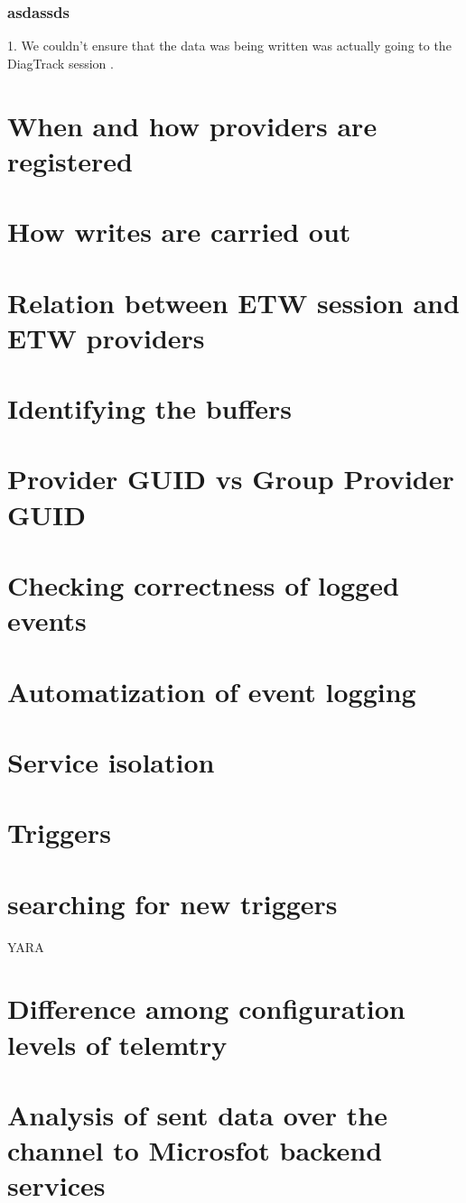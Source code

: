 \subsubsection{\bfseries asdassds}











\newpage
{\huge 1. We couldn't ensure that the data was being written was actually going to the DiagTrack session .}

\section{When and how providers are registered}
\section{How writes are carried out}
\section{Relation between ETW session and ETW providers}
\section{Identifying the buffers}
\section{Provider GUID vs Group Provider GUID}
\section{Checking correctness of logged events}
\section{Automatization of event logging}
\section{Service isolation}
\section{Triggers}
\section{searching for new triggers} YARA
\section{Difference among configuration levels of telemtry}
\section{Analysis of sent data over the channel to Microsfot backend services}

